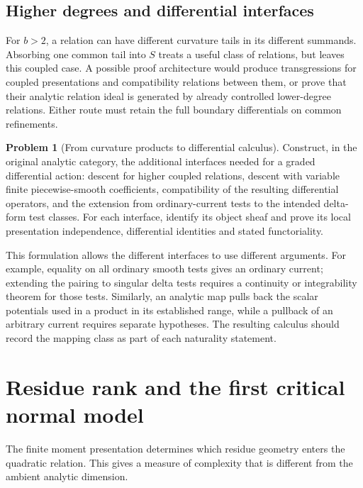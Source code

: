\documentclass[11pt,a4paper]{article}
\theoremstyle{definition}
\newtheorem{problem}[theorem]{Problem}
\theoremstyle{remark}
\numberwithin{equation}{section}
\begin{document}
\subsection{Higher degrees and differential interfaces}

For $b>2$, a relation can have different curvature tails in its different
summands.  Absorbing one common tail into $S$ treats a useful class of
relations, but leaves this coupled case.  A possible proof architecture
would produce transgressions for coupled presentations and compatibility
relations between them, or prove that their analytic relation ideal is
generated by already controlled lower-degree relations.  Either route
must retain the full boundary differentials on common refinements.

\begin{problem}[From curvature products to differential calculus]
\label{problem:interfaces}
Construct, in the original analytic category, the additional interfaces
needed for a graded differential action: descent for higher coupled
relations, descent with variable finite piecewise-smooth coefficients,
compatibility of the resulting differential operators, and the extension
from ordinary-current tests to the intended delta-form test classes.
For each interface, identify its object sheaf and prove its local
presentation independence, differential identities and stated
functoriality.
\end{problem}

This formulation allows the different interfaces to use different
arguments.  For example, equality on all ordinary smooth tests gives
an ordinary current; extending the pairing to singular delta tests
requires a continuity or integrability theorem for those tests.
Similarly, an analytic map pulls back the scalar potentials used in
a product in its established range, while a pullback of an arbitrary
current requires separate hypotheses.  The resulting calculus should
record the mapping class as part of each naturality statement.

\section{Residue rank and the first critical normal model}
\label{sec:rank}

The finite moment presentation determines which residue geometry enters
the quadratic relation.  This gives a measure of complexity that is
different from the ambient analytic dimension.
\end{document}
